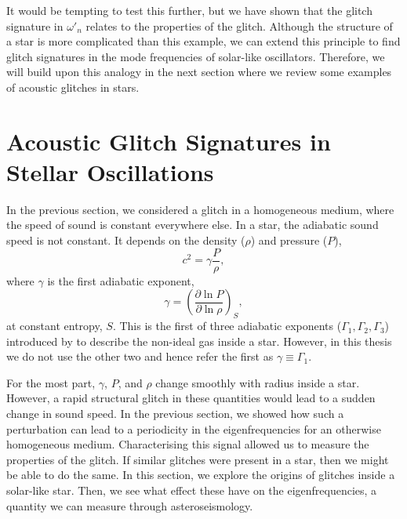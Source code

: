 
It would be tempting to test this further, but we have shown that the glitch signature in \(\omega'_n\) relates to the properties of the glitch. Although the structure of a star is more complicated than this example, we can extend this principle to find glitch signatures in the mode frequencies of solar-like oscillators. Therefore, we will build upon this analogy in the next section where we review some examples of acoustic glitches in stars.



\section[Acoustic Glitches in Stars]{Acoustic Glitch Signatures in Stellar Oscillations}\label{sec:glitch-star}

In the previous section, we considered a glitch in a homogeneous medium, where the speed of sound is constant everywhere else. In a star, the adiabatic sound speed is not constant. It depends on the density (\(\rho\)) and pressure (\(P\)),
%
\begin{equation}
    c^2 = \gamma \frac{P}{\rho},\label{eq:sound}
\end{equation}
%
where \(\gamma\) is the first adiabatic exponent,
%
\begin{equation}
    \gamma = \left( \frac{\partial \ln P}{\partial \ln \rho} \right)_S,
\end{equation}
%
at constant entropy, \(S\). This is the first of three adiabatic exponents (\(\Gamma_1,\Gamma_2,\Gamma_3\)) introduced by \citet{Chandrasekhar1939} to describe the non-ideal gas inside a star. However, in this thesis we do not use the other two and hence refer the first as \(\gamma \equiv \Gamma_1\).

For the most part, \(\gamma\), \(P\), and \(\rho\) change smoothly with radius inside a star. However, a rapid structural glitch in these quantities would lead to a sudden change in sound speed. In the previous section, we showed how such a perturbation can lead to a periodicity in the eigenfrequencies for an otherwise homogeneous medium. Characterising this signal allowed us to measure the properties of the glitch. If similar glitches were present in a star, then we might be able to do the same. In this section, we explore the origins of glitches inside a solar-like star. Then, we see what effect these have on the eigenfrequencies, a quantity we can measure through asteroseismology.

